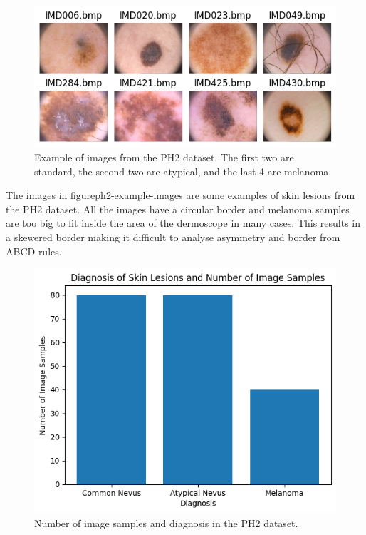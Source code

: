 
\begin{figure}
	\centering
	\includegraphics[scale=0.8]{images/ph2/ph2-example-images.png}
	\caption{Example of images from the PH2 dataset. The first two are standard, the second two are atypical, and the last 4 are melanoma.} 
\end{figure}\label{ph2-example-images}

The images in figure{ph2-example-images} are some examples of skin lesions from the PH2 dataset. All the images have a circular border and melanoma samples are too big to fit inside the area of the dermoscope in many cases. This results in a skewered border making it difficult to analyse asymmetry and border from ABCD rules.

\begin{figure}
	\centering
	\includegraphics[scale=0.8]{images/ph2/ph2-diagnosis-number.png}
	\caption{Number of image samples and diagnosis in the PH2 dataset.} 
\end{figure}\label{ph2-diagnosis-number}

